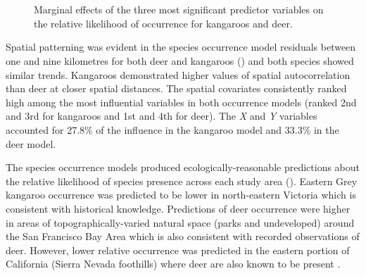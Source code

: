\begin{figure*}[!t]
  \captionsetup[subfloat]{farskip=-2pt,nearskip=-2pt}
  \centering
  \\
  \\
  \caption[Most significant predictor variables on relative likelihood of occurrence for kangaroos and deer]{Marginal effects of the three most significant predictor variables on the relative likelihood of occurrence for kangaroos and deer.}
  \label{cal_occ_effects}
\end{figure*}

Spatial patterning was evident in the species occurrence model residuals between one and nine kilometres for both deer and kangaroos () and both species showed similar trends.  Kangaroos demonstrated higher values of spatial autocorrelation than deer at closer spatial distances.  The spatial covariates consistently ranked high among the most influential variables in both occurrence models (ranked 2nd and 3rd for kangaroos and 1st and 4th for deer).  The \textit{X} and \textit{Y} variables accounted for 27.8\% of the influence in the kangaroo model and 33.3\% in the deer model.

The species occurrence models produced ecologically-reasonable predictions about the relative likelihood of species presence across each study area (). Eastern Grey kangaroo occurrence was predicted to be lower in north-eastern Victoria which is consistent with historical knowledge.  Predictions of deer occurrence were higher in areas of topographically-varied natural space (parks and undeveloped) around the San Francisco Bay Area which is also consistent with recorded observations of deer.  However, lower relative occurrence was predicted in the eastern portion of California (Sierra Nevada foothills) where deer are also known to be present \citep{kuce88}.

